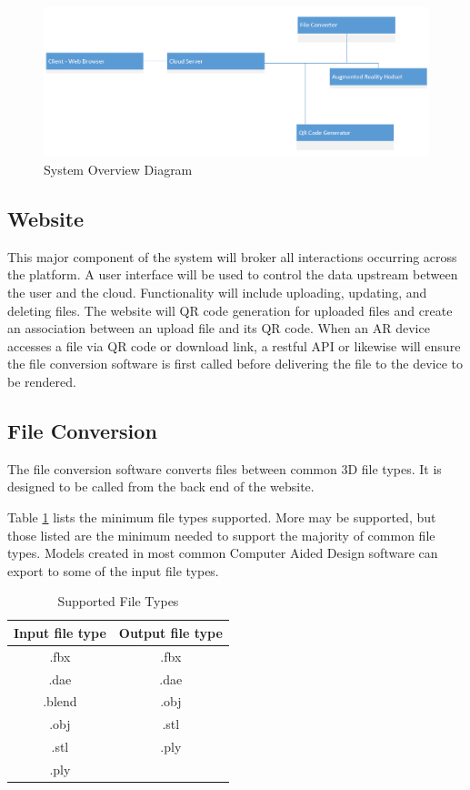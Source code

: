 \begin{figure}[H]
	\centering
	\includegraphics[width=\textwidth]{UMLSystemOverview.png}
	\caption{System Overview Diagram} 
	\label{UMLSystemOverview}	
\end{figure}

\subsection{Website}

This major component of the system will broker all interactions occurring across the platform. A user interface will be used to control the data upstream between the user and the cloud. Functionality will include uploading, updating, and deleting files. The website will QR code generation for uploaded files and create an association between an upload file and its QR code. When an AR device accesses a file via QR code or download link, a restful API or likewise will ensure the file conversion software is first called before delivering the file to the device to be rendered.  

\subsection{File Conversion}
The file conversion software converts files between common 3D file types. It is designed to be called from the back end of the website.

Table \ref{table:suportedfiletypes} lists the minimum file types supported.  More may be supported, but those listed are the minimum needed to support the majority of common file types.  
Models created in most common Computer Aided Design software can export to some of the input file types.

\begin{table}[!h]
    \centering
    \begin{tabular}{| c | c |}
        \hline
        Input file type & Output file type \\
        \hline
        .fbx & .fbx \\
        .dae & .dae \\
        .blend & .obj \\ 
        .obj & .stl \\
        .stl & .ply \\
        .ply & \\
        \hline
    \end{tabular}
    \caption{Supported File Types}
    \label{table:suportedfiletypes}
\end{table}

